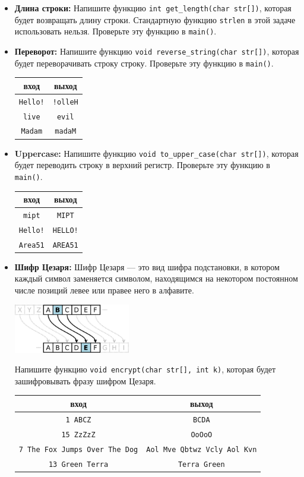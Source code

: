 \documentclass{article}
\begin{document}
\begin{itemize}
\item \textbf{Длина строки:} Напишите функцию \texttt{int get\_length(char str[])}, которая будет возвращать длину строки. Стандартную функцию \texttt{strlen} в этой задаче использовать нельзя. Проверьте эту функцию в \texttt{main()}.

\item \textbf{Переворот:} Напишите функцию \texttt{void reverse\_string(char str[])}, которая будет переворачивать строку строку. Проверьте эту функцию в \texttt{main()}.
\begin{center}
\begin{tabular}{ c | c }
 вход & выход \\ \hline
 \texttt{Hello!} & \texttt{!olleH}  \\ 
 \texttt{live} & \texttt{evil}  \\ 
 \texttt{Madam} & \texttt{madaM}  \\ 
\end{tabular}
\end{center}

\item \textbf{Uppercase:} Напишите функцию \texttt{void to\_upper\_case(char str[])}, которая будет переводить строку в верхний регистр. Проверьте эту функцию в \texttt{main()}.
\begin{center}
\begin{tabular}{ c | c }
 вход & выход \\ \hline
 \texttt{mipt} & \texttt{MIPT} \\
 \texttt{Hello!} & \texttt{HELLO!}  \\ 
 \texttt{Area51} & \texttt{AREA51} \\
\end{tabular}
\end{center}


\item \textbf{Шифр Цезаря:} Шифр Цезаря — это вид шифра подстановки, в котором каждый символ заменяется символом, находящимся на некотором постоянном числе позиций левее или правее него в алфавите. 
\begin{center}
\includegraphics[width=0.4\textwidth]{../images/caesar.png}
\end{center}
Напишите функцию \texttt{void encrypt(char str[], int k)}, которая будет зашифровывать фразу шифром Цезаря.
\begin{center}
\begin{tabular}{ c | c }
 вход & выход \\ \hline
 \texttt{1 ABCZ} & \texttt{BCDA}\\
 \texttt{15 ZzZzZ} & \texttt{OoOoO} \\
 \texttt{7 The Fox Jumps Over The Dog} & \texttt{Aol Mve Qbtwz Vcly Aol Kvn} \\
 \texttt{13  Green Terra} & \texttt{Terra Green}
\end{tabular}
\end{center}



\end{itemize}
\end{document}
